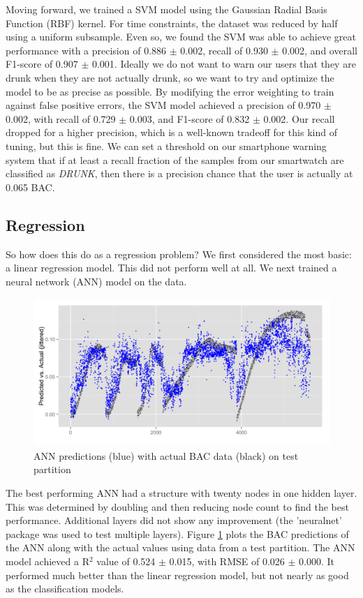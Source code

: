 Moving forward, we trained a SVM model using the Gaussian Radial Basis Function (RBF) kernel. For time constraints, the dataset was reduced by half using a uniform subsample. Even so, we found the SVM was able to achieve great performance with a precision of 0.886 $\pm$ 0.002, recall of 0.930 $\pm$ 0.002, and overall F1-score of 0.907 $\pm$ 0.001. Ideally we do not want to warn our users that they are drunk when they are not actually drunk, so we want to try and optimize the model to be as precise as possible. By modifying the error weighting to train against false positive errors, the SVM model achieved a precision of 0.970 $\pm$ 0.002, with recall of 0.729 $\pm$ 0.003, and F1-score of 0.832 $\pm$ 0.002. Our recall dropped for a higher precision, which is a well-known tradeoff for this kind of tuning, but this is fine. We can set a threshold on our smartphone warning system that if at least a recall fraction of the samples from our smartwatch are classified as \textit{DRUNK}, then there is a precision chance that the user is actually at 0.065 BAC.

\subsection{Regression}

So how does this do as a regression problem? We first considered the most basic: a linear regression model. This did not perform well at all. We next trained a neural network (ANN) model on the data. \begin{figure}
	\includegraphics[width=1.0\textwidth]{figs/nn_all}
	\caption{ANN predictions (blue) with actual BAC data (black) on test partition}
	\label{fig:nn_all}
\end{figure}The best performing ANN had a structure with twenty nodes in one hidden layer. This was determined by doubling and then reducing node count to find the best performance. Additional layers did not show any improvement (the 'neuralnet' package was used to test multiple layers). Figure \ref{fig:nn_all} plots the BAC predictions of the ANN along with the actual values using data from a test partition. The ANN model achieved a R$^2$ value of 0.524 $\pm$ 0.015, with RMSE of 0.026 $\pm$ 0.000. It performed much better than the linear regression model, but not nearly as good as the classification models.